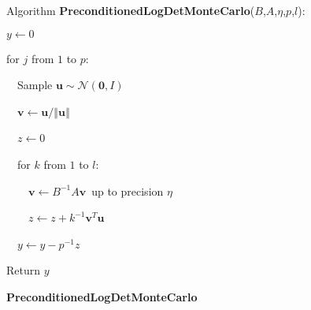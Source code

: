 \begin{algorithm}
Algorithm \textbf{PreconditionedLogDetMonteCarlo}($B$,$A$,$\eta$,$p$,$l$):

$y\leftarrow0$

for $j$ from $1$ to $p$:

~~Sample $\mathbf{u}\sim\mathcal{N}\left(\mathbf{0},I\right)$

~~$\mathbf{v}\leftarrow\mathbf{u}/\left\Vert \mathbf{u}\right\Vert $

~~$z\leftarrow0$

~~for $k$ from $1$ to $l$:

~~~~$\mathbf{v}\leftarrow B^{-1}A\mathbf{v}$~up to precision
$\eta$

~~~~$z\leftarrow z+k^{-1}\mathbf{v}^{T}\mathbf{u}$

~~$y\leftarrow y-p^{-1}z$

Return $y$

\caption{\textbf{PreconditionedLogDetMonteCarlo}\label{alg:SampleLogDet}}
\end{algorithm}


